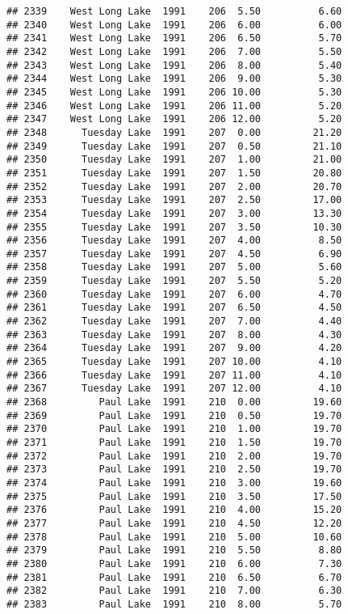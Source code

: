 \documentclass[
]{article}
\begin{document}
\begin{verbatim}
## 2339    West Long Lake  1991    206  5.50          6.60
## 2340    West Long Lake  1991    206  6.00          6.00
## 2341    West Long Lake  1991    206  6.50          5.70
## 2342    West Long Lake  1991    206  7.00          5.50
## 2343    West Long Lake  1991    206  8.00          5.40
## 2344    West Long Lake  1991    206  9.00          5.30
## 2345    West Long Lake  1991    206 10.00          5.30
## 2346    West Long Lake  1991    206 11.00          5.20
## 2347    West Long Lake  1991    206 12.00          5.20
## 2348      Tuesday Lake  1991    207  0.00         21.20
## 2349      Tuesday Lake  1991    207  0.50         21.10
## 2350      Tuesday Lake  1991    207  1.00         21.00
## 2351      Tuesday Lake  1991    207  1.50         20.80
## 2352      Tuesday Lake  1991    207  2.00         20.70
## 2353      Tuesday Lake  1991    207  2.50         17.00
## 2354      Tuesday Lake  1991    207  3.00         13.30
## 2355      Tuesday Lake  1991    207  3.50         10.30
## 2356      Tuesday Lake  1991    207  4.00          8.50
## 2357      Tuesday Lake  1991    207  4.50          6.90
## 2358      Tuesday Lake  1991    207  5.00          5.60
## 2359      Tuesday Lake  1991    207  5.50          5.20
## 2360      Tuesday Lake  1991    207  6.00          4.70
## 2361      Tuesday Lake  1991    207  6.50          4.50
## 2362      Tuesday Lake  1991    207  7.00          4.40
## 2363      Tuesday Lake  1991    207  8.00          4.30
## 2364      Tuesday Lake  1991    207  9.00          4.20
## 2365      Tuesday Lake  1991    207 10.00          4.10
## 2366      Tuesday Lake  1991    207 11.00          4.10
## 2367      Tuesday Lake  1991    207 12.00          4.10
## 2368         Paul Lake  1991    210  0.00         19.60
## 2369         Paul Lake  1991    210  0.50         19.70
## 2370         Paul Lake  1991    210  1.00         19.70
## 2371         Paul Lake  1991    210  1.50         19.70
## 2372         Paul Lake  1991    210  2.00         19.70
## 2373         Paul Lake  1991    210  2.50         19.70
## 2374         Paul Lake  1991    210  3.00         19.60
## 2375         Paul Lake  1991    210  3.50         17.50
## 2376         Paul Lake  1991    210  4.00         15.20
## 2377         Paul Lake  1991    210  4.50         12.20
## 2378         Paul Lake  1991    210  5.00         10.60
## 2379         Paul Lake  1991    210  5.50          8.80
## 2380         Paul Lake  1991    210  6.00          7.30
## 2381         Paul Lake  1991    210  6.50          6.70
## 2382         Paul Lake  1991    210  7.00          6.30
## 2383         Paul Lake  1991    210  8.00          5.70

\end{verbatim}
\end{document}
